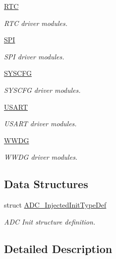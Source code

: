 \begin{DoxyCompactItemize}
\hyperlink{group___r_t_c}{R\-T\-C}
\begin{DoxyCompactList}\small\item\em R\-T\-C driver modules. \end{DoxyCompactList}\item 
\hyperlink{group___s_p_i}{S\-P\-I}
\begin{DoxyCompactList}\small\item\em S\-P\-I driver modules. \end{DoxyCompactList}\item 
\hyperlink{group___s_y_s_c_f_g}{S\-Y\-S\-C\-F\-G}
\begin{DoxyCompactList}\small\item\em S\-Y\-S\-C\-F\-G driver modules. \end{DoxyCompactList}\item 
\hyperlink{group___u_s_a_r_t}{U\-S\-A\-R\-T}
\begin{DoxyCompactList}\small\item\em U\-S\-A\-R\-T driver modules. \end{DoxyCompactList}\item 
\hyperlink{group___w_w_d_g}{W\-W\-D\-G}
\begin{DoxyCompactList}\small\item\em W\-W\-D\-G driver modules. \end{DoxyCompactList}\end{DoxyCompactItemize}
\subsection*{Data Structures}
\begin{DoxyCompactItemize}
\item 
struct \hyperlink{struct_a_d_c___injected_init_type_def}{A\-D\-C\-\_\-\-Injected\-Init\-Type\-Def}
\begin{DoxyCompactList}\small\item\em A\-D\-C Init structure definition. \end{DoxyCompactList}\end{DoxyCompactItemize}


\subsection{Detailed Description}
